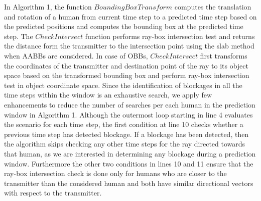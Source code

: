 \documentclass[conference]{IEEEtran}
\begin{document}
In Algorithm 1, the function $BoundingBoxTransform$ computes the translation and rotation of a human from current time step to a predicted time step based on the predicted positions and computes the bounding box at the predicted time step. The $CheckIntersect$ function performs ray-box intersection test and returns the distance form the transmitter to the intersection point using the slab method when AABBs are considered. In case of OBBs, $CheckIntersect$ first transforms the coordinates of the transmitter and destination point of the ray to its object space based on the transformed bounding box and perform  ray-box intersection test in object coordinate space. Since the identification of blockages in all the time steps within the window is an exhaustive search, we apply few enhancements to reduce the number of searches per each human in the prediction window in Algorithm 1. Although the outermost loop starting in line 4 evaluates the scenario for each time step, the first condition at line 10 checks whether a previous time step has detected blockage. If a blockage has been detected, then the algorithm skips checking any other time steps for the ray directed towards that human, as we are interested in determining any blockage during a prediction window. Furthermore the other two conditions in lines 10 and 11 ensure that the ray-box intersection check is done only for humans who are closer to the transmitter than the considered human and both have similar directional vectors with respect to the transmitter. 

\end{document}
